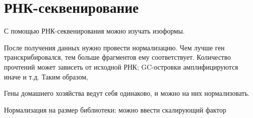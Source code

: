 \documentclass[main.tex]{subfiles}
\begin{document}
	\setcounter{section}{-1}
	\section{РНК-секвенирование}
	
С помощью РНК-секвенирования можно изучать изоформы.

После получения данных нужно провести нормализацию.
Чем лучше ген транскрибировался, тем больше фрагментов ему соответствует.
Количество прочтений может зависеть от исходной РНК; GC-островки амплифицируются иначе и т.д.
Таким образом, %

Гены домашнего хозяйства ведут себя одинаково, и можно на них нормализовать.

Нормализация на размер библиотеки: можно ввести скалирующий фактор
	
\end{document}
